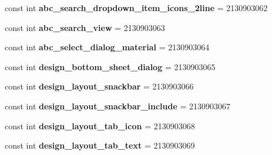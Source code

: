 \begin{DoxyCompactItemize}
\mbox{\label{class_pinned_app_1_1_droid_1_1_resource_1_1_layout_a835168dbf25702c5e56a9c6bf89f5a41}} 
const int {\bfseries abc\+\_\+search\+\_\+dropdown\+\_\+item\+\_\+icons\+\_\+2line} = 2130903062
\item 
\mbox{\label{class_pinned_app_1_1_droid_1_1_resource_1_1_layout_aba7016ac9ee915e383fa137ead71743b}} 
const int {\bfseries abc\+\_\+search\+\_\+view} = 2130903063
\item 
\mbox{\label{class_pinned_app_1_1_droid_1_1_resource_1_1_layout_a2be306f927ae3be2ce2a623f18f13551}} 
const int {\bfseries abc\+\_\+select\+\_\+dialog\+\_\+material} = 2130903064
\item 
\mbox{\label{class_pinned_app_1_1_droid_1_1_resource_1_1_layout_accda54f855e8a4db3ac611cda780043f}} 
const int {\bfseries design\+\_\+bottom\+\_\+sheet\+\_\+dialog} = 2130903065
\item 
\mbox{\label{class_pinned_app_1_1_droid_1_1_resource_1_1_layout_a74b2376f1edcf60bc31377cc613387db}} 
const int {\bfseries design\+\_\+layout\+\_\+snackbar} = 2130903066
\item 
\mbox{\label{class_pinned_app_1_1_droid_1_1_resource_1_1_layout_a17d459c615544d299796ffd94171abed}} 
const int {\bfseries design\+\_\+layout\+\_\+snackbar\+\_\+include} = 2130903067
\item 
\mbox{\label{class_pinned_app_1_1_droid_1_1_resource_1_1_layout_a447e490262bf8a20ecf6947bd79b9790}} 
const int {\bfseries design\+\_\+layout\+\_\+tab\+\_\+icon} = 2130903068
\item 
\mbox{\label{class_pinned_app_1_1_droid_1_1_resource_1_1_layout_af738a1939cf104b60168b68231190d8e}} 
const int {\bfseries design\+\_\+layout\+\_\+tab\+\_\+text} = 2130903069
\item 
\mbox{\label{class_pinned_app_1_1_droid_1_1_resource_1_1_layout_a82bbd4422be26312ea889896233928c5}} 

\end{DoxyCompactItemize}
